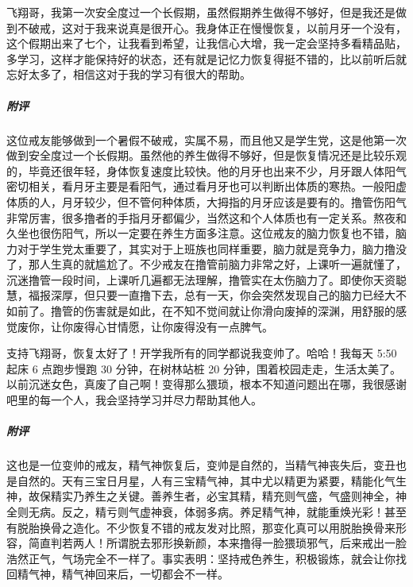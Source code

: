\begin{case}
    飞翔哥，我第一次安全度过一个长假期，虽然假期养生做得不够好，但是我还是做到不破戒，这对于我来说真是很开心。我身体正在慢慢恢复，以前月牙一个没有，这个假期出来了七个，让我看到希望，让我信心大增，我一定会坚持多看精品贴，多学习，这样才能保持好的状态，还有就是记忆力恢复得挺不错的，比以前听后就忘好太多了，相信这对于我的学习有很大的帮助。
    \subparagraph{附评} 这位戒友能够做到一个暑假不破戒，实属不易，而且他又是学生党，这是他第一次做到安全度过一个长假期。虽然他的养生做得不够好，但是恢复情况还是比较乐观的，毕竟还很年轻，身体恢复速度比较快。他的月牙也出来不少，月牙跟人体阳气密切相关，看月牙主要是看阳气，通过看月牙也可以判断出体质的寒热。一般阳虚体质的人，月牙较少，但不管何种体质，大拇指的月牙应该是要有的。撸管伤阳气非常厉害，很多撸者的手指月牙都偏少，当然这和个人体质也有一定关系。熬夜和久坐也很伤阳气，所以一定要在养生方面多注意。这位戒友的脑力恢复也不错，脑力对于学生党太重要了，其实对于上班族也同样重要，脑力就是竞争力，脑力撸没了，那人生真的就尴尬了。不少戒友在撸管前脑力非常之好，上课听一遍就懂了，沉迷撸管一段时间，上课听几遍都无法理解，撸管实在太伤脑力了。即使你天资聪慧，福报深厚，但只要一直撸下去，总有一天，你会突然发现自己的脑力已经大不如前了。撸管的伤害就是如此，在不知不觉间就让你滑向废掉的深渊，用舒服的感觉废你，让你废得心甘情愿，让你废得没有一点脾气。
\end{case}

\begin{case}
    支持飞翔哥，恢复太好了！开学我所有的同学都说我变帅了。哈哈！我每天 5:50 起床 6 点跑步慢跑 30 分钟，在树林站桩 20 分钟，围着校园走走，生活太美了。以前沉迷女色，真废了自己啊！变得那么猥琐，根本不知道问题出在哪，我很感谢吧里的每一个人，我会坚持学习并尽力帮助其他人。
    \subparagraph{附评} 这也是一位变帅的戒友，精气神恢复后，变帅是自然的，当精气神丧失后，变丑也是自然的。天有三宝日月星，人有三宝精气神，其中尤以精更为紧要，精能化气生神，故保精实乃养生之关键。善养生者，必宝其精，精充则气盛，气盛则神全，神全则无病。反之，精亏则气虚神衰，体弱多病。养足精气神，就能重焕光彩！甚至有脱胎换骨之造化。不少恢复不错的戒友发对比照，那变化真可以用脱胎换骨来形容，简直判若两人！所谓脱去邪形换新颜，本来撸得一脸猥琐邪气，后来戒出一脸浩然正气，气场完全不一样了。事实表明：坚持戒色养生，积极锻炼，就会让你找回精气神，精气神回来后，一切都会不一样。
\end{case}

